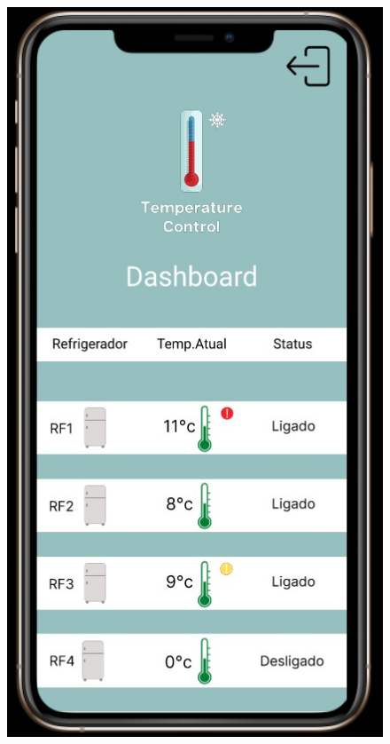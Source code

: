 \begin{figure}
\begin{minipage}{0.5\textwidth}
            \centering
            \includegraphics[height=0.4\textheight]{img/mobile/dashboard_1.jpeg}
            \label{fig:mobileDashboard1}
        \end{minipage}
    \end{figure}

